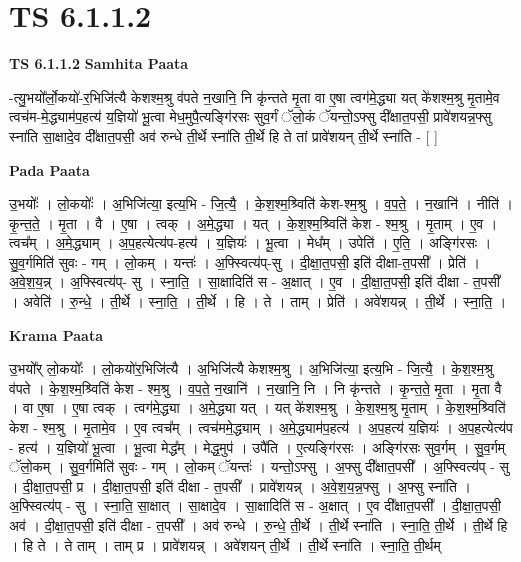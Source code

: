 \documentclass[17pt]{extarticle}
\begin{document}
\section{ TS 6.1.1.2 }

\textbf{TS 6.1.1.2 } \newline
\textbf{Samhita Paata} \newline

-त्यु॒भयो᳚र्लो॒कयो॑-र॒भिजि॑त्यै केशश्म॒श्रु व॑पते न॒खानि॒ नि कृ॑न्तते मृ॒ता वा ए॒षा त्वग॑मे॒द्ध्या यत् के॑शश्म॒श्रु मृ॒तामे॒व त्वच॑म-मे॒द्ध्याम॑प॒हत्य॑ य॒ज्ञियो॑ भू॒त्वा मेध॒मुपै॒त्यङ्गि॑रसः सुव॒र्गं ॅलो॒कं ॅयन्तो॒ऽफ्सु दी᳚क्षात॒पसी॒ प्रावे॑शयन्न॒फ्सु स्ना॑ति सा॒क्षादे॒व दी᳚क्षात॒पसी॒ अव॑ रुन्धे ती॒र्थे स्ना॑ति ती॒र्थे हि ते तां प्रावे॑शयन् ती॒र्थे स्ना॑ति - [  ] \newline

\textbf{Pada Paata} \newline

उ॒भयोः᳚ । लो॒कयोः᳚ । अ॒भिजि॑त्या॒ इत्य॒भि - जि॒त्यै॒ । के॒श॒श्म॒श्र्विति॑ केश-श्म॒श्रु । व॒प॒ते॒ । न॒खानि॑ । नीति॑ । कृ॒न्त॒ते॒ । मृ॒ता । वै । ए॒षा । त्वक् । अ॒मे॒द्ध्या । यत् । के॒श॒श्म॒श्र्विति॑ केश - श्म॒श्रु । मृ॒ताम् । ए॒व । त्वच᳚म् । अ॒मे॒द्ध्याम् । अ॒प॒हत्येत्य॑प-हत्य॑ । य॒ज्ञियः॑ । भू॒त्वा । मेध᳚म् । उपेति॑ । ए॒ति॒ । अङ्गि॑रसः । सु॒व॒र्गमिति॑ सुवः - गम् । लो॒कम् । यन्तः॑ । अ॒फ्स्वित्य॑प्-सु । दी॒क्षा॒त॒पसी॒ इति॑ दीक्षा-त॒पसी᳚ । प्रेति॑ । अ॒वे॒श॒य॒न्न् । अ॒फ्स्वित्य॑प्- सु । स्ना॒ति॒ । सा॒क्षादिति॑ स - अ॒क्षात् । ए॒व । दी॒क्षा॒त॒पसी॒ इति॑ दीक्षा - त॒पसी᳚ । अवेति॑ । रु॒न्धे॒ । ती॒र्थे । स्ना॒ति॒ । ती॒र्थे । हि । ते । ताम् । प्रेति॑ । अवे॑शयन्न् । ती॒र्थे । स्ना॒ति॒ ।  \newline


\textbf{Krama Paata} \newline

उ॒भयो᳚र् लो॒कयोः᳚ । लो॒कयो॑र॒भिजि॑त्यै । अ॒भिजि॑त्यै केशश्म॒श्रु । अ॒भिजि॑त्या॒ इत्य॒भि - जि॒त्यै॒ । के॒श॒श्म॒श्रु व॑पते । के॒श॒श्म॒श्र्विति॑ केश - श्म॒श्रु । व॒प॒ते॒ न॒खानि॑ । न॒खानि॒ नि । नि कृ॑न्तते । कृ॒न्त॒ते॒ मृ॒ता । मृ॒ता वै । वा ए॒षा । ए॒षा त्वक् । त्वग॑मे॒द्ध्या । अ॒मे॒द्ध्या यत् । यत् के॑शश्म॒श्रु । के॒श॒श्म॒श्रु मृ॒ताम् । के॒श॒श्म॒श्र्विति॑ केश - श्म॒श्रु । मृ॒तामे॒व । ए॒व त्वच᳚म् । त्वच॑ममे॒द्ध्याम् । अ॒मे॒द्ध्याम॑प॒हत्य॑ । अ॒प॒हत्य॑ य॒ज्ञियः॑ । अ॒प॒हत्येत्य॑प - हत्य॑ । य॒ज्ञियो॑ भू॒त्वा । भू॒त्वा मेद्ध᳚म् । मेद्ध॒मुप॑ । उपै॑ति । ए॒त्यङ्‍गि॑रसः । अङ्‍गि॑रसः सुव॒र्गम् । सु॒व॒र्गम् ॅलो॒कम् । सु॒व॒र्गमिति॑ सुवः - गम् । लो॒कम् ॅयन्तः॑ । यन्तो॒ऽफ्सु । अ॒फ्सु दी᳚क्षात॒पसी᳚ । अ॒फ्स्वित्य॑प् - सु । दी॒क्षा॒त॒पसी॒ प्र । दी॒क्षा॒त॒पसी॒ इति॑ दीक्षा - त॒पसी᳚ । प्रावे॑शयन्न् । अ॒वे॒श॒य॒न्न॒फ्सु । अ॒फ्सु स्ना॑ति । अ॒फ्स्वित्य॑प् - सु । स्ना॒ति॒ सा॒क्षात् । सा॒क्षादे॒व । सा॒क्षादिति॑ स - अ॒क्षात् । ए॒व दी᳚क्षात॒पसी᳚ । दी॒क्षा॒त॒पसी॒ अव॑ । दी॒क्षा॒त॒पसी॒ इति॑ दीक्षा - त॒पसी᳚ । अव॑ रुन्धे । रु॒न्धे॒ ती॒र्थे । ती॒र्थे स्ना॑ति । स्ना॒ति॒ ती॒र्थे । ती॒र्थे हि । हि ते । ते ताम् । ताम् प्र । प्रावे॑शयन्न् । अवे॑शयन् ती॒र्थे । ती॒र्थे स्ना॑ति । स्ना॒ति॒ ती॒र्थम् \newline
\end{document}
